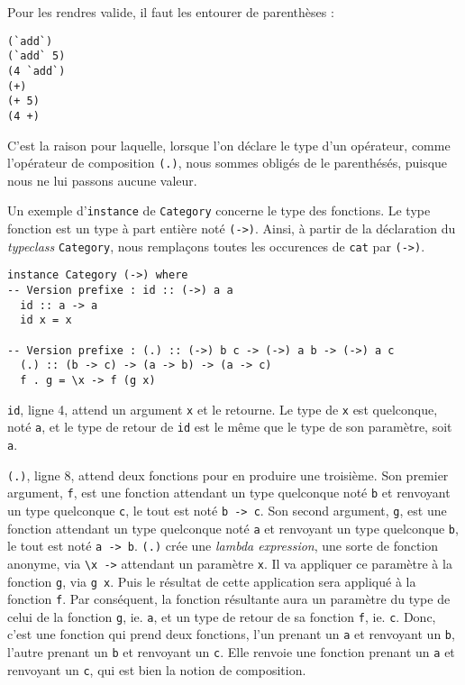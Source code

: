 \documentclass{llncs}
\begin{document}
Pour les rendres valide, il faut les entourer de parenthèses :
\begin{lstlisting}
(`add`)
(`add` 5)
(4 `add`)
(+)
(+ 5)
(4 +)
\end{lstlisting}

C'est la raison pour laquelle, lorsque l'on déclare le type d'un opérateur, comme
l'opérateur de composition \lstinline{(.)}, nous sommes obligés de le parenthésés,
puisque nous ne lui passons aucune valeur.

Un exemple d'\lstinline{instance} de \lstinline{Category} concerne le type des fonctions.
Le type fonction est un type à part entière noté \lstinline{(->)}.
Ainsi, à partir de la déclaration du \emph{typeclass} \lstinline{Category}, nous
remplaçons toutes les occurences de \lstinline{cat} par \lstinline{(->)}.
\begin{lstlisting}
instance Category (->) where
-- Version prefixe : id :: (->) a a
  id :: a -> a
  id x = x

-- Version prefixe : (.) :: (->) b c -> (->) a b -> (->) a c
  (.) :: (b -> c) -> (a -> b) -> (a -> c)
  f . g = \x -> f (g x)
\end{lstlisting}

\lstinline{id}, ligne 4, attend un argument \lstinline{x} et le retourne.
Le type de \lstinline{x} est quelconque, noté \lstinline{a}, et le type de retour
de \lstinline{id} est le même que le type de son paramètre, soit \lstinline{a}.

\lstinline{(.)}, ligne 8, attend deux fonctions pour en produire une troisième.
Son premier argument, \lstinline{f}, est une fonction attendant un type quelconque
noté \lstinline{b} et renvoyant un type quelconque \lstinline{c}, le tout est
noté \lstinline{b -> c}.
Son second argument, \lstinline{g}, est une fonction attendant un type quelconque
noté \lstinline{a} et renvoyant un type quelconque \lstinline{b}, le tout est
noté \lstinline{a -> b}.
\lstinline{(.)} crée une \emph{lambda expression}, une sorte de fonction anonyme,
via \lstinline{\x ->} attendant un paramètre \lstinline{x}.
Il va appliquer ce paramètre à la fonction \lstinline{g}, via \lstinline{g x}.
Puis le résultat de cette application sera appliqué à la fonction \lstinline{f}.
Par conséquent, la fonction résultante aura un paramètre du type de celui de la
fonction \lstinline{g}, ie. \lstinline{a}, et un type de retour de sa fonction \lstinline{f},
ie. \lstinline{c}.
Donc, c'est une fonction qui prend deux fonctions, l'un prenant un \lstinline{a}
et renvoyant un \lstinline{b}, l'autre prenant un \lstinline{b} et renvoyant un \lstinline{c}.
Elle renvoie une fonction prenant un \lstinline{a} et renvoyant un \lstinline{c},
qui est bien la notion de composition.
\end{document}
